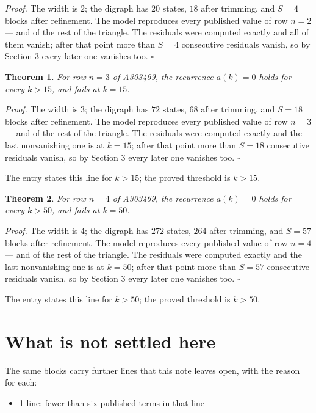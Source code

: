 \documentclass[11pt]{article}
\newtheorem{theorem}{Theorem}
\theoremstyle{definition}
\begin{document}
{\itshape Proof.} The width is $2$; the digraph has $20$ states, $18$ after trimming, and $S = 4$ blocks after refinement. The model reproduces every published value of row $n = 2$ --- and of the rest of the triangle. The residuals were computed exactly and all of them vanish; after that point more than $S = 4$ consecutive residuals vanish, so by Section 3 every later one vanishes too. $\square$

\begin{theorem} For row $n = 3$ of A303469, the recurrence $a(k) = 0$ holds for every $k > 15$, and fails at $k = 15$.\end{theorem}

{\itshape Proof.} The width is $3$; the digraph has $72$ states, $68$ after trimming, and $S = 18$ blocks after refinement. The model reproduces every published value of row $n = 3$ --- and of the rest of the triangle. The residuals were computed exactly and the last nonvanishing one is at $k = 15$; after that point more than $S = 18$ consecutive residuals vanish, so by Section 3 every later one vanishes too. $\square$

The entry states this line for $k > 15$; the proved threshold is $k > 15$.

\begin{theorem} For row $n = 4$ of A303469, the recurrence $a(k) = 0$ holds for every $k > 50$, and fails at $k = 50$.\end{theorem}

{\itshape Proof.} The width is $4$; the digraph has $272$ states, $264$ after trimming, and $S = 57$ blocks after refinement. The model reproduces every published value of row $n = 4$ --- and of the rest of the triangle. The residuals were computed exactly and the last nonvanishing one is at $k = 50$; after that point more than $S = 57$ consecutive residuals vanish, so by Section 3 every later one vanishes too. $\square$

The entry states this line for $k > 50$; the proved threshold is $k > 50$.

\section{What is not settled here}

The same blocks carry further lines that this note leaves open, with the reason for each:

\begin{itemize}

\item 1 line: fewer than six published terms in that line

\end{itemize}
\end{document}
